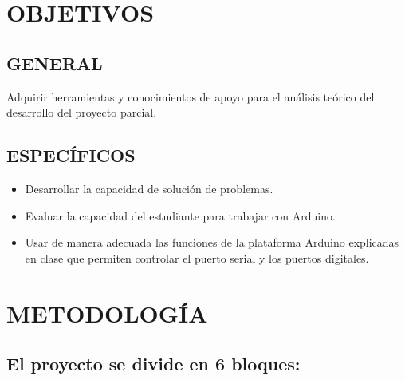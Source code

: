 \documentclass{article}
\begin{document}
\section{OBJETIVOS}

\subsection{GENERAL}

Adquirir herramientas y conocimientos de apoyo para el análisis teórico del desarrollo del proyecto parcial.

\subsection{ESPECÍFICOS}

\begin{itemize}

        \item Desarrollar la capacidad de solución de problemas.
        
        \item Evaluar la capacidad del estudiante para trabajar con Arduino.
        
        \item Usar de manera adecuada las funciones de la
plataforma Arduino explicadas en clase que permiten controlar el puerto serial y los puertos digitales.
\end{itemize}

\section{METODOLOGÍA}

\subsection{El proyecto se divide en 6 bloques:}
\end{document}
